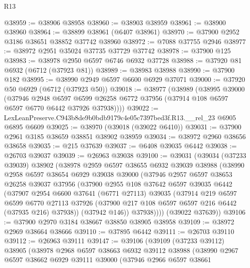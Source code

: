 \begin{lexlean}{R13}
\begin{coremodule}
@38959 := @38906 @38958
@38960 := @38903 @38959
@38961 := @38900 @38960
@38964 := @38899 @38961 (@6407 @38961)
@38970 := @37900 @2952 @3186 @38651 @38852 @37742 @38960
@38972 := @7088 @37755 @2946
@38977 := @38972 @2951 @35024 @37735 @37729 @37742
@38978 := @37900 @125
@38983 := @38978 @2950 @6597 @6746 @6932 @37728
@38988 := @37920 @81 @6932 (@6712 (@37923 @81))
@38989 := @38983 @38988
@38990 := @37900 @182
@38995 := @38990 @2949 @6597 @6600 @6929 @37071
@39000 := @37920 @50 @6929 (@6712 (@37923 @50))
@39018 := @38977
    (@38989
      (@38995
        @39000
        (@37946
          @2948
          @6597
          @6599
          @26258
          @6772
          @37956
          (@37914 @108 @6597 @6597 @6770 @6442 @37926 @37938))))
@39022 := LexLeanPreserve.C943b8de9b0bdb9179c4e05c7397bed3f.R13.__rel_23 @6905 @6895 @6609
@39025 := @38970 (@39018 (@39022 @6410))
@39031 := @37900 @2961 @3185 @38659 @38851 @38902 @38959
@39034 := @38972 @2960 @38656 @38658
@39035 := @215 @37639
@39037 := @6408 @39035 @6442
@39038 := @26703 @39037
@39039 := @26963 @39038
@39100 := @39031
    (@39034
      (@37233 @39039)
      @38902
      (@38978
        @2959
        @6597
        @38655
        @6932
        @39039
        @38988
        (@38990
          @2958
          @6597
          @38654
          @6929
          @39038
          @39000
          (@37946
            @2957
            @6597
            @38653
            @26258
            @39037
            @37956
            (@37900
              @2955
              @108
              @37642
              @6597
              @39035
              @6442
              (@37907
                @2954
                @6600
                @37641
                (@6771 @27113)
                @39035
                (@37914
                  @219
                  @6597
                  @6599
                  @6770
                  @27113
                  @37926
                  (@37900 @217 @108 @6597 @6597 @216 @6442 (@37935 @216) @37938))
                (@37942 @146))
              @37938))))
      (@39022 @37639))
@39106 := @37900 @2970 @3184 @38667 @38850 @38905 @38958
@39109 := @38972 @2969 @38664 @38666
@39110 := @37895 @6442
@39111 := @26703 @39110
@39112 := @26963 @39111
@39147 := @39106
    (@39109
      (@37233 @39112)
      @38905
      (@38978
        @2968
        @6597
        @38663
        @6932
        @39112
        @38988
        (@38990
          @2967
          @6597
          @38662
          @6929
          @39111
          @39000
          (@37946
            @2966
            @6597
            @38661

\end{coremodule}
\end{lexlean}
